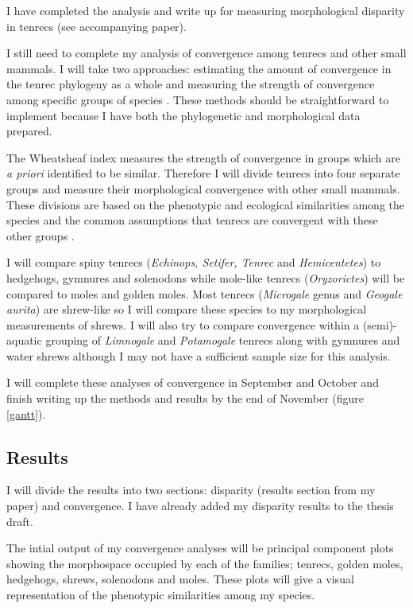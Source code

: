 \documentclass[12pt,a4paper]{article}
\begin{document}
	I have completed the analysis and write up for measuring morphological disparity in tenrecs (see accompanying paper).
	
	I still need to complete my analysis of convergence among tenrecs and other small mammals. I will take two approaches: estimating the amount of convergence in the tenrec phylogeny as a whole \citep{Stayton2008} and measuring the strength of convergence among specific groups of species \citep{Arbuckle2014}. These methods should be straightforward to implement because I have both the phylogenetic and morphological data prepared. 
	
	The Wheatsheaf index \citep{Arbuckle2014} measures the strength of convergence in groups which are \textit{a priori} identified to be similar. Therefore I will divide tenrecs into four separate groups and measure their morphological convergence with other small mammals. These divisions are based on the phenotypic and ecological similarities among the species and the common assumptions that tenrecs are convergent with these other groups \citep[e.g.][]{Soarimalala2011, Olson2013}. 
	
	I will compare spiny tenrecs (\textit{Echinops, Setifer, Tenrec} and \textit{Hemicentetes}) to hedgehogs, gymnures and solenodons while mole-like tenrecs (\textit{Oryzorictes}) will be compared to moles and golden moles. Most tenrecs (\textit{Microgale} genus and \textit{Geogale aurita}) are shrew-like so I will compare these species to my morphological measurements of shrews. I will also try to compare convergence within a (semi)-aquatic grouping of \textit{Limnogale} and \textit{Potamogale} tenrecs along with gymnures and water shrews although I may not have a sufficient sample size for this analysis. 
		
	I will complete these analyses of convergence in September and October and finish writing up the methods and results by the end of November (figure \ref{gantt}).

 
\subsection{Results}
	
	I will divide the results into two sections: disparity (results section from my paper) and convergence. I have already added my disparity results to the thesis draft.
	
	The intial output of my convergence analyses will be principal component plots showing the morphospace occupied by each of the families; tenrecs, golden moles, hedgehogs, shrews, solenodons and moles. These plots will give a visual representation of the phenotypic similarities among my species.
	
\end{document}
